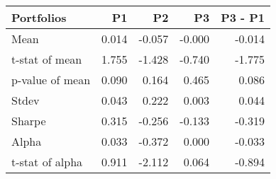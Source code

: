 \begin{tabular}{lrrrr}
\toprule
Portfolios & P1 & P2 & P3 & P3 - P1 \\
\midrule
Mean & 0.014 & -0.057 & -0.000 & -0.014 \\
t-stat of mean & 1.755 & -1.428 & -0.740 & -1.775 \\
p-value of mean & 0.090 & 0.164 & 0.465 & 0.086 \\
Stdev & 0.043 & 0.222 & 0.003 & 0.044 \\
Sharpe & 0.315 & -0.256 & -0.133 & -0.319 \\
Alpha & 0.033 & -0.372 & 0.000 & -0.033 \\
t-stat of alpha & 0.911 & -2.112 & 0.064 & -0.894 \\
\bottomrule
\end{tabular}

